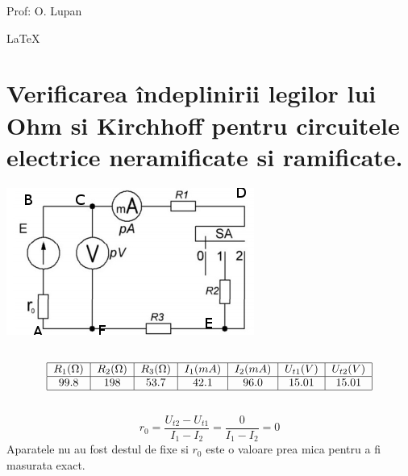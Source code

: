 \documentclass{article}
\begin{document}
	\begin{flushright}
		Prof: O. Lupan
	\end{flushright}

	\LaTeX
	\pagebreak %

	\raggedright
	\section{Verificarea îndeplinirii legilor lui Ohm si Kirchhoff pentru circuitele electrice neramificate si ramificate.}
		\begin{center}
			\includegraphics[scale=0.7]{./imgs/ElectricCircuit1.jpg}
		\end{center}

	\subsection{}
		\[
			\begin{tabular}{|c|c|c|c|c|c|c|c|}
				\hline
				$R_1 (\Omega)$ & $R_2 (\Omega)$ & $R_3 (\Omega)$ & $I_1 (mA)$ & $I_2 (mA)$ & $U_{t1} (V)$ & $U_{t2} (V)$\\
				\hline
				\ROne & \RTwo & \RThree & \IPosOne & \IPosTwo& 15.01 & 15.01\\
				\hline
			\end{tabular}
		\]

	\subsection{}
		\[
			r_0 = \frac{U_{t2} - U_{t1}}{I_1 - I_2} = \frac{0}{I_1 - I_2} = 0
		\]
		Aparatele nu au fost destul de fixe si $r_0$ este o valoare prea mica pentru a fi masurata exact.

	\subsection{}
\end{document}
